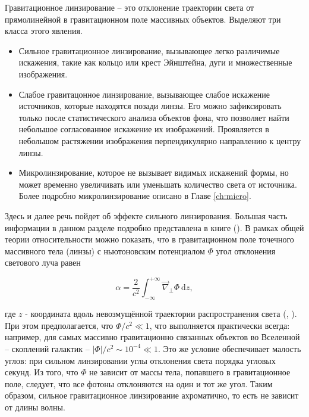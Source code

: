 Гравитационное линзирование -- это отклонение  траектории света от прямолинейной в гравитационном поле массивных объектов. Выделяют три класса этого явления.

\begin{itemize}
    \item Сильное гравитационное линзирование, вызывающее легко различимые искажения, такие как кольцо или крест Эйнштейна, дуги и множественные изображения.
    \item Слабое гравитацонное линзирование, вызывающее слабое искажение источников, которые находятся позади линзы. Его можно зафиксировать только после статистического анализа объектов фона, что позволяет найти небольшое согласованное искажение их изображений. Проявляется в небольшом растяжении изображения перпендикулярно направлению к центру линзы.
    \item Микролинзирование, которое не вызывает видимых искажений формы, но может временно увеличивать или уменьшать количество света от источника. Более подробно микролинзирование описано в Главе \ref{ch:micro}.
\end{itemize}

Здесь и далее речь пойдет об эффекте сильного линзирования. Большая часть информации в данном разделе подробно представлена в книге (\cite{gravlensbook}). В рамках общей теории относительности можно показать, что в гравитационном поле точечного массивного тела (линзы) с ньютоновским потенциалом $\Phi$ угол отклонения светового луча равен

\begin{equation}\label{eq:angle}
{\alpha}=\frac{2}{c^{2}} \int_{-\infty}^{+\infty} \vec{\nabla}_{\perp} \Phi \ \mathrm{d} z,
\end{equation}

\noindent где $z$ - координата вдоль невозмущённой траектории распространения света (\cite{narbart}, \cite{gl_all}). При этом предполагается, что $\Phi/c^2 \ll 1$, что выполняется практически всегда: например, для самых массивно гравитационно связанных объектов во Вселенной -- скоплений галактик --  $|\Phi|/c^2 \sim 10^{-4} \ll 1$. Это же условие обеспечивает малость углов: при сильном линзировании углы отклонения света порядка угловых секунд. Из того, что $\Phi$ не зависит от массы тела, попавшего в гравитационное поле, следует, что все фотоны отклоняются на один и тот же угол. Таким образом, сильное гравитационное линзирование ахроматично, то есть не зависит от длины волны. 

